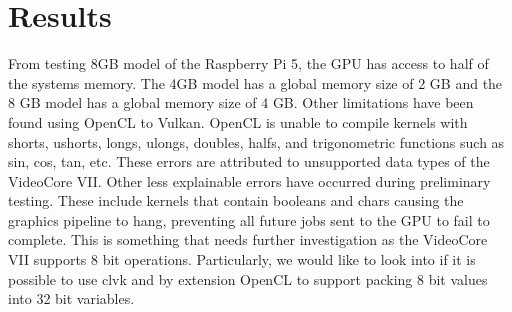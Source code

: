 \documentclass[conference]{IEEEtran}
\begin{document}
 \section{Results}


  From testing 8GB model of the Raspberry Pi 5, the GPU has access to half of the systems memory. 
 The 4GB model has a global memory size of 2 GB and the 8 GB model has a global memory size of 4 GB. Other limitations 
 have been found using OpenCL to Vulkan. OpenCL is unable to compile kernels with shorts, ushorts, longs, ulongs, doubles,
 halfs, and trigonometric functions such as sin, cos, tan, etc. These errors are attributed to unsupported data 
 types of the VideoCore VII. Other less explainable errors have occurred during preliminary testing. These include
 kernels that contain booleans and chars causing the graphics pipeline to hang, preventing all future jobs sent to 
 the GPU to fail to complete. This is something that needs further investigation as the VideoCore VII supports 8 bit 
 operations. Particularly, we would like to look into if it is possible to use clvk and by extension OpenCL to support 
 packing 8 bit values into 32 bit variables.
\end{document}
